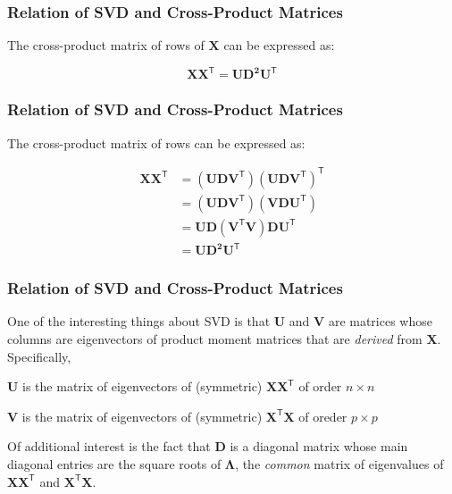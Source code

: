 \documentclass[12pt]{beamer}\usepackage[]{graphicx}\usepackage[]{color}
\begin{document}

\begin{frame}
\frametitle{Relation of SVD and Cross-Product Matrices}

The cross-product matrix of rows of $\mathbf{X}$ can be expressed as:

{\Large
$$
\mathbf{XX^\mathsf{T} = U D^2 U^\mathsf{T}}
$$
}

\end{frame}


\begin{frame}
\frametitle{Relation of SVD and Cross-Product Matrices}

The cross-product matrix of rows can be expressed as:

{\large
\begin{align*}
\mathbf{X X^\mathsf{T}} &= (\mathbf{U D V^\mathsf{T}}) (\mathbf{U D V^\mathsf{T}})^\mathsf{T} \\
&= (\mathbf{U D V^\mathsf{T}}) (\mathbf{V D U^\mathsf{T}}) \\
&= \mathbf{U D} (\mathbf{V^\mathsf{T}} \mathbf{V}) \mathbf{D U^\mathsf{T}} \\
&= \mathbf{U D^2 U^\mathsf{T}}
\end{align*}
}

\end{frame}


\begin{frame}
\frametitle{Relation of SVD and Cross-Product Matrices}

One of the interesting things about SVD is that $\mathbf{U}$ and $\mathbf{V}$ are 
matrices whose columns are eigenvectors of product moment matrices that are 
\textit{derived} from $\mathbf{X}$. Specifically, 

\bi
  \item $\mathbf{U}$ is the matrix of eigenvectors of (symmetric) $\mathbf{XX^\mathsf{T}}$ of order $n \times n$
  \item $\mathbf{V}$ is the matrix of eigenvectors of (symmetric) $\mathbf{X^\mathsf{T}X}$ 
of oreder $p \times p$
\ei

Of additional interest is the fact that $\mathbf{D}$ is a diagonal matrix whose 
main diagonal entries are the square roots of $\mathbf{\Lambda}$, the \textit{common} 
matrix of eigenvalues of $\mathbf{XX^\mathsf{T}}$ and $\mathbf{X^\mathsf{T}X}$.

\end{frame}
\end{document}
